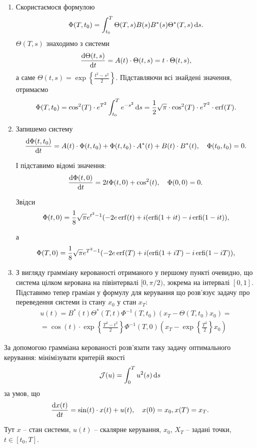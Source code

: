 \begin{solution}
	\begin{enumerate}
		\item Скористаємося формулою \[\Phi(T, t_0) = \int_{t_0}^T \Theta(T, s) B(s) B^*(s) \Theta^*(T, s) \mathop{}\!\mathrm{d} s.\] $\Theta(T, s)$ знаходимо з системи \[ \frac{\mathop{}\!\mathrm{d} \Theta(t,s)}{\mathop{}\!\mathrm{d} t} = A(t) \cdot \Theta(t, s) = t \cdot \Theta(t, s),\] а саме $\Theta(t, s) = \exp\left\{\frac{t^2 - s^2}{2}\right\}$. Підставляючи всі знайдені значення, отримаємо \[\Phi(T, t_0) = \cos^2(T) \cdot e^{T^2} \int_{t_0}^T e^{-s^2} \mathop{}\!\mathrm{d} s = \frac{1}{2} \sqrt{\pi} \cdot \cos^2(T) \cdot e^{T^2} \cdot \operatorname{erf}(T).\]

		\item Запишемо систему \[ \frac{\mathop{}\!\mathrm{d} \Phi (t, t_0)}{\mathop{}\!\mathrm{d} t} = A(t) \cdot \Phi(t, t_0) + \Phi(t, t_0) \cdot A^*(t) + B(t) \cdot B^*(t), \quad \Phi(t_0, t_0) = 0. \]

		І підставимо відомі значення: \[ \frac{\mathop{}\!\mathrm{d} \Phi (t, 0)}{\mathop{}\!\mathrm{d} t} = 2 t \Phi(t, 0)  + \cos^2(t), \quad \Phi(0, 0) = 0. \]

		Звідси \[ \Phi(t, 0) = \frac{1}{8} \sqrt{\pi} e^{t^2 - 1} ( - 2 e \operatorname{erf}(t) + i (\operatorname{erfi}(1 + i t) - i \operatorname{erfi}(1 - i t)), \]

		а \[ \Phi(T, 0) = \frac{1}{8} \sqrt{\pi} e^{T^2 - 1} ( - 2 e \operatorname{erf}(T) + i (\operatorname{erfi}(1 + i T) - i \operatorname{erfi}(1 - i T)), \]

		\item З вигляду грамміану керованості отриманого у першому пункті очевидно, що система цілком керована на півінтервалі $[0, \pi / 2)$, зокрема на інтервалі $[0, 1]$. \\

		Підставимо тепер граміан у формулу для керування що розв'язує задачу про переведення системи із стану $x_0$ у стан $x_T$:
		\begin{multline*} u(t) = B^*(t) \Theta^*(T, t) \Phi^{-1}(T, t_0) (x_T - \Theta(T, t_0) x_0) = \\ = \cos(t) \cdot \exp\left\{\frac{T^2-t^2}{2}\right\} \Phi^{-1} (T, 0) \left(x_T - \exp\left\{\frac{T^2}{2}\right\} x_0\right) \end{multline*}
	\end{enumerate}
\end{solution}

\begin{problem}
	За допомогою грамміана керованості розв'язати таку задачу оптимального керування: мінімізувати критерій якості \[ \mathcal{J} (u) = \int_0^T u^2(s) \mathop{}\!\mathrm{d} s\] за умов, що \[ \frac{\mathop{}\!\mathrm{d} x(t)}{\mathop{}\!\mathrm{d} t} = \sin(t) \cdot x(t) + u(t), \quad x (0) = x_0, x (T) = x_T. \]

	Тут $x$ -- стан системи, $u(t)$ -- скалярне керування, $x_0$, $X_T$ -- задані точки, $t \in [t_0, T]$.
\end{problem}

